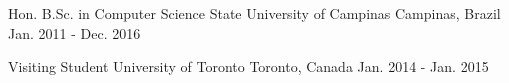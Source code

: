 

\begin{cventries}

  \cventry
    {Hon. B.Sc. in Computer Science} %
    {State University of Campinas} %
    {Campinas, Brazil} %
    {Jan. 2011 - Dec. 2016} %
    {}

  \cventry
    {Visiting Student} %
    {University of Toronto} %
    {Toronto, Canada} %
    {Jan. 2014 - Jan. 2015} %
    {}

\end{cventries}

\newpage

